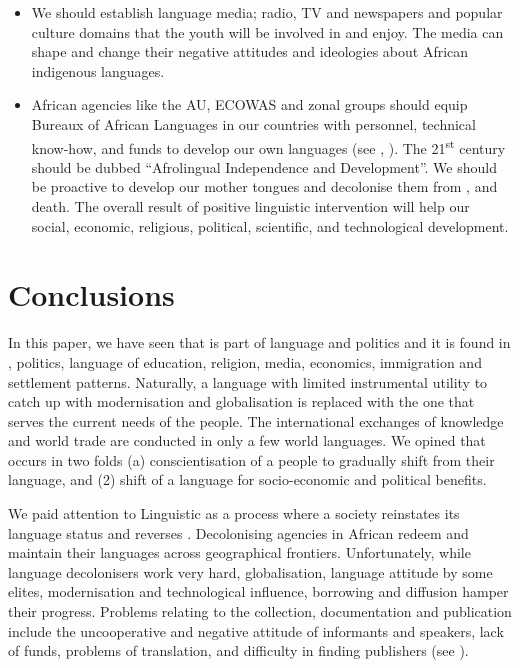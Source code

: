 \documentclass[output=paper,
modfonts
]{langscibook}
\begin{document}
\begin{itemize}
\item 
We should establish language media; radio, TV and newspapers and popular culture domains that the youth will be involved in and enjoy. The media can shape and change their negative attitudes and ideologies about African indigenous languages.

\item 
African agencies like the AU, ECOWAS and zonal groups should equip Bureaux of African Languages in our countries with personnel, technical know-how, and funds to develop our own languages (see \citealt{Agyekum2012}, \citeyear{Agyekum2003}). The 21\textsuperscript{st} century should be dubbed “Afrolingual Independence and Development”. We should be proactive to develop our mother tongues and decolonise them from ,  and death. The overall result of positive linguistic intervention will help our social, economic, religious, political, scientific, and technological development. 

\end{itemize}
\section{Conclusions}

In this paper, we have seen that  is part of language and politics and it is found in , politics, language of education, religion, media, economics, immigration and settlement patterns. Naturally, a language with limited instrumental utility to catch up with modernisation and globalisation is replaced with the one that serves the current needs of the people. The international exchanges of knowledge and world trade are conducted in only a few world languages. We opined that  occurs in two folds (a) conscientisation of a people to gradually shift from their language, and (2) shift of a language for socio-economic and political benefits.

We paid attention to Linguistic  as a process where a society reinstates its language status and reverses . Decolonising agencies in African redeem and maintain their languages across geographical frontiers. Unfortunately, while language decolonisers work very hard, globalisation, language attitude by some elites, modernisation and technological influence, borrowing and diffusion hamper their progress. Problems relating to the collection, documentation and publication include the uncooperative and negative attitude of informants and speakers, lack of funds, problems of translation, and difficulty in finding publishers (see \citealt[5]{Bamgbose2011}). 
\end{document}
